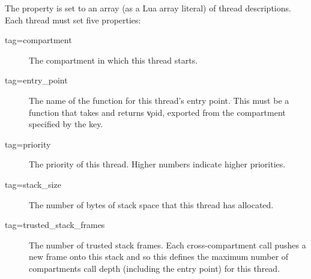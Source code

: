 \lualisting[filename=examples/hello_world/xmake.lua,marker=firmware,label=lst:xmakefirmware,caption="Build system code for linking the final firmware image"]{}

The  property is set to an array (as a Lua array literal) of thread descriptions.
Each thread must set five properties:

\begin{description}
	\item[tag=compartment]{ The compartment in which this thread starts.}
	\item[tag=entry_point]{ The name of the function for this thread's entry point.
		This must be a function that takes and returns \c{void}, exported from the compartment specified by the  key.}
	\item[tag=priority]{ The priority of this thread.
		Higher numbers indicate higher priorities.}
	\item[tag=stack_size]{ The number of bytes of stack space that this thread has allocated.}
	\item[tag=trusted_stack_frames]{ The number of trusted stack frames.
		Each cross-compartment call pushes a new frame onto this stack and so this defines the maximum number of compartments call depth (including the entry point) for this thread.}
\end{description}
